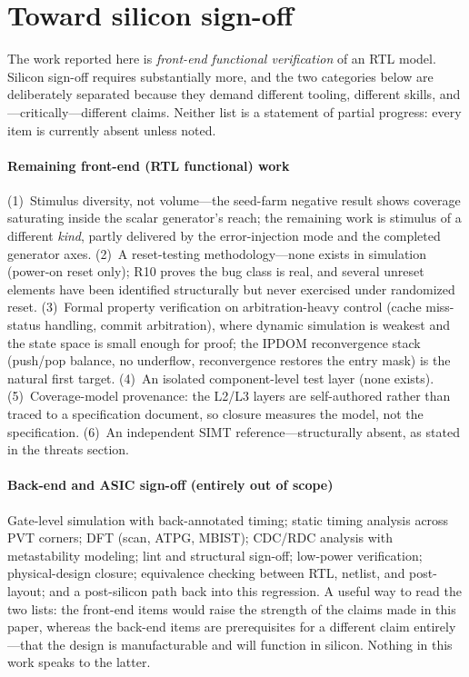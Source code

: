\documentclass[review,12pt]{elsarticle}
\begin{document}
\section{Toward silicon sign-off}
The work reported here is \emph{front-end functional verification} of
an RTL model. Silicon sign-off requires substantially more, and the
two categories below are deliberately separated because they demand
different tooling, different skills, and---critically---different
claims. Neither list is a statement of partial progress: every item
is currently absent unless noted.

\paragraph{Remaining front-end (RTL functional) work} (1)~Stimulus
diversity, not volume---the seed-farm negative result shows coverage
saturating inside the scalar generator's reach; the remaining work is
stimulus of a different \emph{kind}, partly delivered by the
error-injection mode and the completed generator axes. (2)~A
reset-testing methodology---none exists in simulation (power-on
reset only); R10 proves the bug class is real, and several unreset
elements have been identified structurally but never exercised under
randomized reset. (3)~Formal property verification on
arbitration-heavy control (cache miss-status handling, commit
arbitration), where dynamic simulation is weakest and the state space
is small enough for proof; the IPDOM reconvergence stack
(push/pop balance, no underflow, reconvergence restores the entry
mask) is the natural first target. (4)~An isolated component-level
test layer (none exists). (5)~Coverage-model provenance: the L2/L3
layers are self-authored rather than traced to a specification
document, so closure measures the model, not the specification.
(6)~An independent SIMT reference---structurally absent, as stated in
the threats section.

\paragraph{Back-end and ASIC sign-off (entirely out of scope)}
Gate-level simulation with back-annotated timing; static timing
analysis across PVT corners; DFT (scan, ATPG, MBIST); CDC/RDC
analysis with metastability modeling; lint and structural sign-off;
low-power verification; physical-design closure; equivalence
checking between RTL, netlist, and post-layout; and a post-silicon
path back into this regression. A useful way to read the two lists:
the front-end items would raise the strength of the claims made in
this paper, whereas the back-end items are prerequisites for a
different claim entirely---that the design is manufacturable and
will function in silicon. Nothing in this work speaks to the latter.
\end{document}
